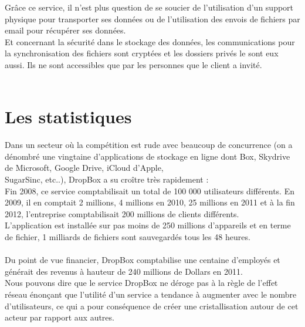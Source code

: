 \documentclass[a4paper, 10pt]{article}
\begin{document}
\newpage
\noindent
Gr\^ace ce service, il n'est plus question de se soucier de l'utilisation d'un support physique pour transporter ses donn\'ees
ou de l'utilisation des envois de fichiers par email pour r\'ecup\'erer ses donn\'ees.\\
Et concernant la s\'ecurit\'e dans le stockage des donn\'ees, les communications pour la synchronisation des fichiers sont crypt\'ees et
les dossiers priv\'es le sont eux aussi. Ils ne sont accessibles que par les personnes que le client a invit\'e.\\ \\

\section*{Les statistiques}
Dans un secteur o\`u la comp\'etition est rude avec beaucoup de concurrence
(on a d\'enombr\'e une vingtaine d'applications de stockage en ligne dont Box, Skydrive de Microsoft, Google Drive, iCloud d'Apple,\\SugarSinc,
etc..), DropBox a su cro\^itre tr\`es rapidement :\\
Fin 2008, ce service comptabilisait un total de 100 000 utilisateurs diff\'erents.
En 2009, il en comptait 2 millions, 4 millions en 2010, 25 millions en 2011 et
\`a la fin 2012, l'entreprise comptabilisait 200 millions de clients diff\'erents.\\
L'application est install\'ee sur pas moins de 250 millions d'appareils et
en terme de fichier, 1 milliards de fichiers sont sauvegard\'es tous les 48 heures.\\ \\
Du point de vue financier, DropBox comptabilise une centaine d'employ\'es et g\'en\'erait des revenus \`a hauteur
de 240 millions de Dollars en 2011.\\
Nous pouvons dire que le service DropBox ne d\'eroge pas \`a la r\`egle de l'effet r\'eseau \'enonçant que l'utilit\'e d'un service
a tendance \`a augmenter avec le nombre d'utilisateurs, ce qui a pour cons\'equence de cr\'eer une cristallisation autour de cet acteur
par rapport aux autres.\\ \\
\end{document}
